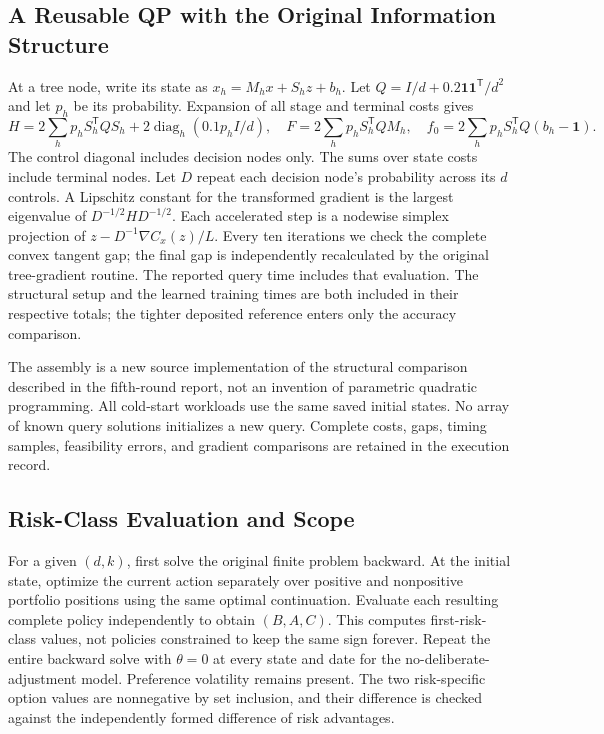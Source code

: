 \subsection{A Reusable QP with the Original Information Structure}
At a tree node, write its state as $x_h=M_hx+S_hz+b_h$. Let
$Q=I/d+0.2\mathbf1\mathbf1^{\mathsf T}/d^2$ and let $p_h$ be its probability. Expansion of all stage and terminal costs gives
\[
 H=2\sum_hp_hS_h^{\mathsf T}QS_h+2\operatorname{diag}_h(0.1p_hI/d),\quad
 F=2\sum_hp_hS_h^{\mathsf T}QM_h,\quad
 f_0=2\sum_hp_hS_h^{\mathsf T}Q(b_h-\mathbf1).
\]
The control diagonal includes decision nodes only. The sums over state costs include terminal nodes. Let $D$ repeat each decision node's probability across its $d$ controls. A Lipschitz constant for the transformed gradient is the largest eigenvalue of $D^{-1/2}HD^{-1/2}$. Each accelerated step is a nodewise simplex projection of $z-D^{-1}\nabla C_x(z)/L$. Every ten iterations we check the complete convex tangent gap; the final gap is independently recalculated by the original tree-gradient routine. The reported query time includes that evaluation. The structural setup and the learned training times are both included in their respective totals; the tighter deposited reference enters only the accuracy comparison.

The assembly is a new source implementation of the structural comparison described in the fifth-round report, not an invention of parametric quadratic programming. All cold-start workloads use the same saved initial states. No array of known query solutions initializes a new query. Complete costs, gaps, timing samples, feasibility errors, and gradient comparisons are retained in the execution record.

\subsection{Risk-Class Evaluation and Scope}
For a given $(d,k)$, first solve the original finite problem backward. At the initial state, optimize the current action separately over positive and nonpositive portfolio positions using the same optimal continuation. Evaluate each resulting complete policy independently to obtain $(B,A,C)$. This computes first-risk-class values, not policies constrained to keep the same sign forever. Repeat the entire backward solve with $\theta=0$ at every state and date for the no-deliberate-adjustment model. Preference volatility remains present. The two risk-specific option values are nonnegative by set inclusion, and their difference is checked against the independently formed difference of risk advantages.

